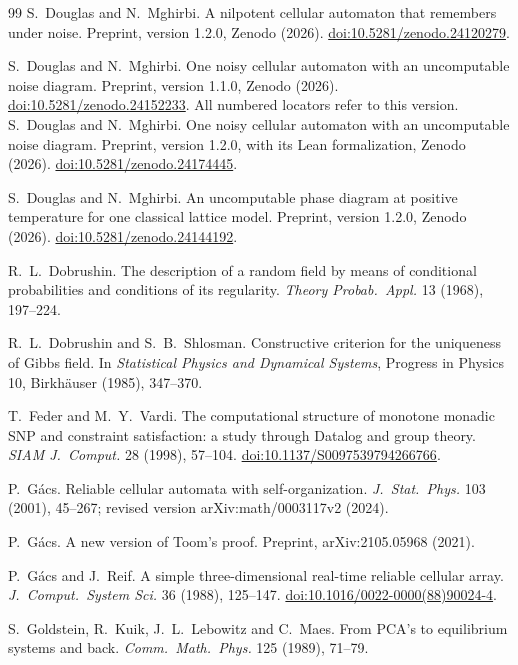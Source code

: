 \begin{thebibliography}{99}
 S.~Douglas and N.~Mghirbi. A nilpotent cellular automaton that remembers under noise. Preprint, version 1.2.0, Zenodo (2026). \href{https://doi.org/10.5281/zenodo.24120279}{doi:10.5281/zenodo.24120279}.

 S.~Douglas and N.~Mghirbi. One noisy cellular automaton with an uncomputable noise diagram. Preprint, version 1.1.0, Zenodo (2026). \href{https://doi.org/10.5281/zenodo.24152233}{doi:10.5281/zenodo.24152233}. All numbered locators refer to this version.
 S.~Douglas and N.~Mghirbi. One noisy cellular automaton with an uncomputable noise diagram. Preprint, version 1.2.0, with its Lean formalization, Zenodo (2026). \href{https://doi.org/10.5281/zenodo.24174445}{doi:10.5281/zenodo.24174445}.

 S.~Douglas and N.~Mghirbi. An uncomputable phase diagram at positive temperature for one classical lattice model. Preprint, version 1.2.0, Zenodo (2026). \href{https://doi.org/10.5281/zenodo.24144192}{doi:10.5281/\allowbreak zenodo.24144192}.

 R.~L.~Dobrushin. The description of a random field by means of conditional probabilities and conditions of its regularity. \emph{Theory Probab.\ Appl.} 13 (1968), 197--224.

 R.~L.~Dobrushin and S.~B.~Shlosman. Constructive criterion for the uniqueness of Gibbs field. In \emph{Statistical Physics and Dynamical Systems}, Progress in Physics 10, Birkh\"auser (1985), 347--370.

 T.~Feder and M.~Y.~Vardi. The computational structure of monotone monadic SNP and constraint satisfaction: a study through Datalog and group theory. \emph{SIAM J.\ Comput.} 28 (1998), 57--104. \href{https://doi.org/10.1137/S0097539794266766}{doi:10.1137/S0097539794266766}.

 P.~G\'acs. Reliable cellular automata with self-organization. \emph{J.\ Stat.\ Phys.} 103 (2001), 45--267; revised version arXiv:math/0003117v2 (2024).

 P.~G\'acs. A new version of Toom's proof. Preprint, arXiv:2105.05968 (2021).

 P.~G\'acs and J.~Reif. A simple three-dimensional real-time reliable cellular array. \emph{J.\ Comput.\ System Sci.} 36 (1988), 125--147. \href{https://doi.org/10.1016/0022-0000(88)90024-4}{doi:10.1016/0022-0000(88)90024-4}.

 S.~Goldstein, R.~Kuik, J.~L.~Lebowitz and C.~Maes. From PCA's to equilibrium systems and back. \emph{Comm.\ Math.\ Phys.} 125 (1989), 71--79.


\end{thebibliography}
